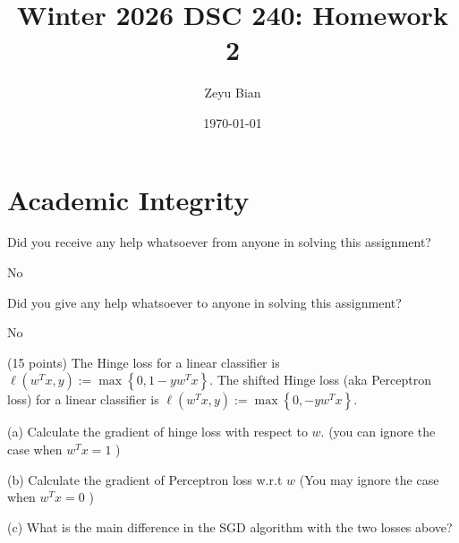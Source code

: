 \documentclass[en,hazy,blue,12pt,normal]{elegantnote}
\title{Winter 2026 DSC 240: Homework 2}
\author{Zeyu Bian}
\date{\today}
\begin{document}
\maketitle


\section*{Academic Integrity}
Did you receive any help whatsoever from anyone in solving this assignment? 

No

Did you give any help whatsoever to anyone in solving this assignment? 

No

\begin{homework}
(15 points) The Hinge loss for a linear classifier is $\ell\left(w^T x, y\right):=\max \left\{0,1-y w^T x\right\}$. The shifted Hinge loss (aka Perceptron loss) for a linear classifier is $\ell\left(w^T x, y\right):=\max \left\{0,-y w^T x\right\}$.

(a) Calculate the gradient of hinge loss with respect to $w$.
(you can ignore the case when $w^T x=1$ )

(b) Calculate the gradient of Perceptron loss w.r.t $w$
(You may ignore the case when $w^T x=0$ )

(c) What is the main difference in the SGD algorithm with the two losses above?

\end{homework}
\end{document}

